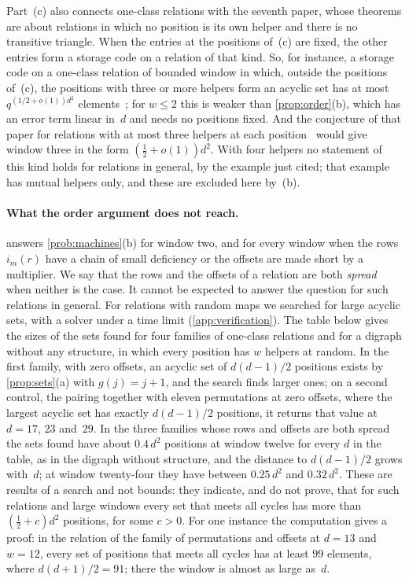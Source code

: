 Part~(c) also connects one-class relations with the seventh paper, whose theorems are about relations in which no
position is its own helper and there is no transitive triangle. When the entries at the positions of~(c) are fixed,
the other entries form a storage code on a relation of that kind. So, for instance, a storage code on a one-class
relation of bounded window in which, outside the positions of~(c), the positions with three or more helpers form an
acyclic set has at most
$q^{(1/2+o(1))d^2}$ elements~\cite[Theorem~5.3]{SeventhPaper2026}; for $w\le2$ this is weaker than
\cref{prop:order}(b), which has an error term linear in~$d$ and needs no positions fixed. And the conjecture of that
paper for relations with at most three helpers at each position~\cite[Conjecture~9.1]{SeventhPaper2026} would give
window three in the form $(\tfrac12+o(1))d^2$. With four helpers no statement of this kind holds for relations in
general, by the example just cited; that example has mutual helpers only, and these are excluded here by~(b).

\paragraph{What the order argument does not reach.}  answers \cref{prob:machines}(b) for window
two, and for every window when the rows $i_m(r)$ have a chain of small deficiency or the offsets are made short by a
multiplier. We say that the rows and the offsets of a relation are both \emph{spread} when neither is the case. It
cannot be expected to answer the question for such relations in general. For relations with random maps we
searched for large acyclic sets, with a solver under a time limit (\cref{app:verification}). The table below gives
the sizes of the sets found for four families of one-class relations and for a digraph without any structure, in
which every position has $w$ helpers at random. In the first family, with zero offsets, an acyclic set of $d(d-1)/2$
positions exists by \cref{prop:sets}(a) with $g(j)=j+1$, and the search finds larger ones; on a second control, the
pairing together with eleven permutations at zero offsets, where the largest acyclic set has exactly $d(d-1)/2$
positions, it returns that value at $d=17$, $23$ and~$29$. In the three families whose rows and offsets are both
spread the sets found have about $0.4\,d^2$ positions at window twelve for every $d$ in the table, as in the digraph
without structure, and the distance to $d(d-1)/2$ grows with~$d$; at window twenty-four they have between
$0.25\,d^2$ and $0.32\,d^2$. These are results of a search and not bounds: they indicate, and do not prove, that
for such relations and large windows every set that meets all cycles has more than $(\tfrac12+c)d^2$ positions, for
some $c>0$. For one instance the computation gives a proof: in the relation of the family of permutations and
offsets at $d=13$ and $w=12$, every set of positions that meets all cycles has at least $99$ elements, where
$d(d+1)/2=91$; there the window is almost as large as~$d$.


